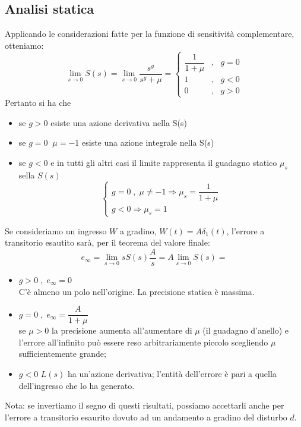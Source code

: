 \documentclass[a4paper]{report}
\begin{document}
\subsection{Analisi statica}
Applicando le considerazioni fatte per la funzione di sensitivit\`a
complementare, otteniamo:
\[
\lim_{s \to 0} S(s) = \lim_{s \to 0} \dfrac{s^g}{s^g + \mu} =
\left\{
\begin{array}{cll}
  \dfrac{1}{1 + \mu} &,& g = 0\\
  1 &,& g < 0\\
  0 &,& g > 0
\end{array}
\right.
\]
Pertanto si ha che
\begin{itemize}
\item se $g > 0$ esiste una azione derivativa nella S(s)
\item se $g = 0\;\;\mu = -1$ esiste una azione integrale nella S(s)
\item se $g < 0$ e in tutti gli altri casi il limite rappresenta il
  guadagno statico $\mu_s$ sella $S(s)$
  \[
  \left\{
  \begin{array}{l}
    g = 0\;,\;\mu \neq -1 \Rightarrow \mu_s = \dfrac{1}{1 +
      \mu}\\
    g < 0 \Rightarrow \mu_s = 1
  \end{array}
  \right.
  \]
\end{itemize}
Se consideriamo un ingresso $W$ a gradino, $W(t) = A \delta_1(t)$,
l'errore a transitorio esautito sar\`a, per il teorema del valore
finale:
\[
e_{\infty} = \lim_{s \to 0} s S(s) \dfrac{A}{s} = A \lim_{s \to 0}
  S(s) =
\]
\begin{itemize}
\item $g > 0 \;,\; e_{\infty} = 0$ \\
  C'\`e almeno un polo nell'origine. La precisione statica \`e
  massima.
\item $g = 0\;,\; e_{\infty} = \dfrac{A}{1 + \mu}$\\
  se $\mu > 0$ la precisione aumenta all'aumentare di $\mu$ (il
  guadagno d'anello) e l'errore all'infinito pu\`o essere reso
  arbitrariamente piccolo scegliendo $\mu$ sufficientemente grande;  
\item $g < 0$ $L(s)$ ha un'azione derivativa; l'entit\`a dell'errore
  \`e pari a quella dell'ingresso che lo ha generato.
\end{itemize}
Nota: se invertiamo il segno di questi risultati, possiamo accettarli
anche per l'errore a transitorio esaurito dovuto ad un andamento a
gradino del disturbo $d$.
\end{document}
